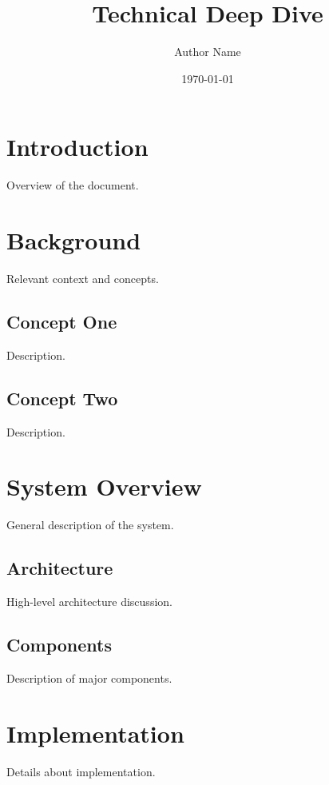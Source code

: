 \documentclass[11pt]{article}
\title{Technical Deep Dive}
\author{Author Name}
\date{\today}
\begin{document}
\maketitle
\thispagestyle{empty}

\newpage
\tableofcontents
\newpage

\section{Introduction}

Overview of the document.

\section{Background}

Relevant context and concepts.

\subsection{Concept One}

Description.

\subsection{Concept Two}

Description.

\section{System Overview}

General description of the system.

\subsection{Architecture}

High-level architecture discussion.

\subsection{Components}

Description of major components.

\section{Implementation}

Details about implementation.
\end{document}
